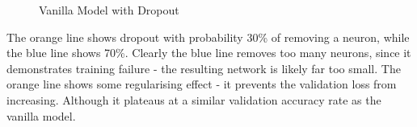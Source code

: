 \documentclass[11pt]{article} %
\theoremstyle{plain}
\theoremstyle{definition}
\begin{document}
\begin{figure}[!ht]
\centering
{}
\newline
{}
\caption{Vanilla Model with Dropout}
\label{fig:vanilla_dropout}
\end{figure}
\FloatBarrier
\noindent
The orange line shows dropout with probability 30\% of removing a neuron, while the blue line shows 70\%. Clearly the blue line removes too many neurons, since it demonstrates training failure - the resulting network is likely far too small. The orange line shows some regularising effect - it prevents the validation loss from increasing. Although it plateaus at a similar validation accuracy rate as the vanilla model.
\end{document}
